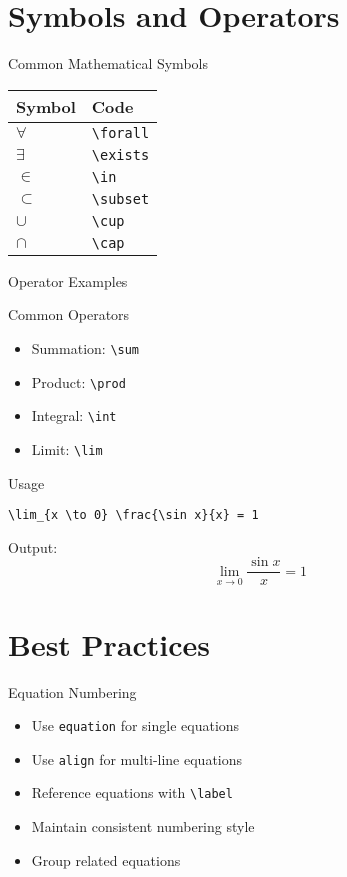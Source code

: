 \documentclass{beamer}
\begin{document}
\section{Symbols and Operators}
\begin{frame}{Common Mathematical Symbols}
\begin{table}
\centering
\begin{tabular}{ll}
\hline
Symbol & Code \\
\hline
\( \forall \) & \texttt{\textbackslash forall} \\
\( \exists \) & \texttt{\textbackslash exists} \\
\( \in \) & \texttt{\textbackslash in} \\
\( \subset \) & \texttt{\textbackslash subset} \\
\( \cup \) & \texttt{\textbackslash cup} \\
\( \cap \) & \texttt{\textbackslash cap} \\
\hline
\end{tabular}
\end{table}
\end{frame}

\begin{frame}{Operator Examples}
\begin{exampleblock}{Common Operators}
\begin{itemize}
\item Summation: \texttt{\textbackslash sum}
\item Product: \texttt{\textbackslash prod}
\item Integral: \texttt{\textbackslash int}
\item Limit: \texttt{\textbackslash lim}
\end{itemize}
\end{exampleblock}

\begin{exampleblock}{Usage}
\begin{lstlisting}
\lim_{x \to 0} \frac{\sin x}{x} = 1
\end{lstlisting}
Output:
\[
\lim_{x \to 0} \frac{\sin x}{x} = 1
\]
\end{exampleblock}
\end{frame}

\section{Best Practices}
\begin{frame}{Equation Numbering}
\begin{itemize}
\item Use \texttt{equation} for single equations
\item Use \texttt{align} for multi-line equations
\item Reference equations with \texttt{\textbackslash label}
\item Maintain consistent numbering style
\item Group related equations
\end{itemize}
\end{frame}
\end{document}
